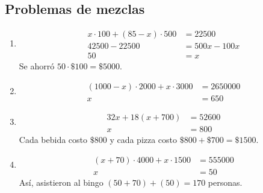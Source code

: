 \documentclass{sn-guia}
\begin{document}
\subsection{Problemas de mezclas}
\begin{enumerate}
    \item 
    \begin{align*}
        x\cdot 100 + (85-x)\cdot 500 &= 22500 \\ 
        42500 - 22500 &= 500x - 100x\\
        50 &= x
    \end{align*}
    Se ahorró $50\cdot \$ 100=\$ 5000$. 
    \item \begin{align*}
        (1000-x)\cdot 2000 + x\cdot 3000 &= 2650000\\
        x &= 650
    \end{align*}
    \item \begin{align*}
        32x + 18(x+700) &= 52600 \\
        x &= 800
    \end{align*}
    Cada bebida costo $\$800$ y cada pizza costo $\$800 + \$700 = \$1500$.
    \item \begin{align*}
        (x+70)\cdot 4000 + x\cdot 1500 &= 555000 \\
        x &= 50
    \end{align*}
    Así, asistieron al bingo $(50+70) + (50) = 170$ personas.   
\end{enumerate}
\end{document}
